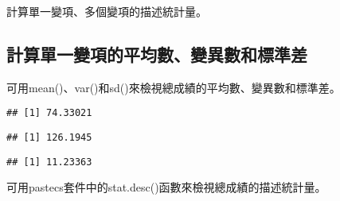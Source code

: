 \documentclass[
]{book}
\newenvironment{Shaded}{\begin{snugshade}}{\end{snugshade}}
\newcommand{\AttributeTok}[1]{\textcolor[rgb]{0.77,0.63,0.00}{#1}}
\newcommand{\ConstantTok}[1]{\textcolor[rgb]{0.00,0.00,0.00}{#1}}
\newcommand{\FloatTok}[1]{\textcolor[rgb]{0.00,0.00,0.81}{#1}}
\newcommand{\FunctionTok}[1]{\textcolor[rgb]{0.00,0.00,0.00}{#1}}
\newcommand{\NormalTok}[1]{#1}
\newcommand{\SpecialCharTok}[1]{\textcolor[rgb]{0.00,0.00,0.00}{#1}}
\begin{document}
計算單一變項、多個變項的描述統計量。

\hypertarget{ux8a08ux7b97ux55aeux4e00ux8b8aux9805ux7684ux5e73ux5747ux6578ux8b8aux7570ux6578ux548cux6a19ux6e96ux5dee}{%
\subsection{計算單一變項的平均數、變異數和標準差}\label{ux8a08ux7b97ux55aeux4e00ux8b8aux9805ux7684ux5e73ux5747ux6578ux8b8aux7570ux6578ux548cux6a19ux6e96ux5dee}}

可用mean()、var()和sd()來檢視總成績的平均數、變異數和標準差。

\begin{Shaded}
\end{Shaded}

\begin{verbatim}
## [1] 74.33021
\end{verbatim}

\begin{Shaded}
\end{Shaded}

\begin{verbatim}
## [1] 126.1945
\end{verbatim}

\begin{Shaded}
\end{Shaded}

\begin{verbatim}
## [1] 11.23363
\end{verbatim}

可用pastecs套件中的stat.desc()函數來檢視總成績的描述統計量。

\begin{Shaded}
\end{Shaded}
\end{document}
